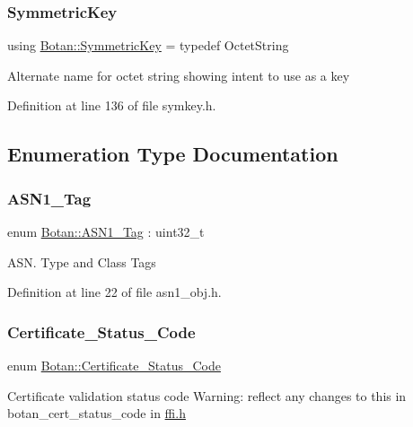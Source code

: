 \subsubsection{\texorpdfstring{Symmetric\+Key}{SymmetricKey}}
{\footnotesize\ttfamily using \mbox{\hyperlink{namespace_botan_a89cf6c3513428f524454d01830221a88}{Botan\+::\+Symmetric\+Key}} = typedef Octet\+String}

Alternate name for octet string showing intent to use as a key 

Definition at line 136 of file symkey.\+h.



\subsection{Enumeration Type Documentation}
\mbox{\label{namespace_botan_acc1ab433420bdddbcfe52dbbd94e8576}} 
\subsubsection{\texorpdfstring{A\+S\+N1\+\_\+\+Tag}{ASN1\_Tag}}
{\footnotesize\ttfamily enum \mbox{\hyperlink{namespace_botan_acc1ab433420bdddbcfe52dbbd94e8576}{Botan\+::\+A\+S\+N1\+\_\+\+Tag}} \+: uint32\+\_\+t}

A\+S\+N. Type and Class Tags 

Definition at line 22 of file asn1\+\_\+obj.\+h.

\mbox{\label{namespace_botan_ae1e907dc90937bdda30f65216e68ff2b}} 
\subsubsection{\texorpdfstring{Certificate\+\_\+\+Status\+\_\+\+Code}{Certificate\_Status\_Code}}
{\footnotesize\ttfamily enum \mbox{\hyperlink{namespace_botan_ae1e907dc90937bdda30f65216e68ff2b}{Botan\+::\+Certificate\+\_\+\+Status\+\_\+\+Code}}\hspace{0.3cm}{\ttfamily [strong]}}

Certificate validation status code Warning\+: reflect any changes to this in botan\+\_\+cert\+\_\+status\+\_\+code in \mbox{\hyperlink{ffi_8h_source}{ffi.\+h}} 

